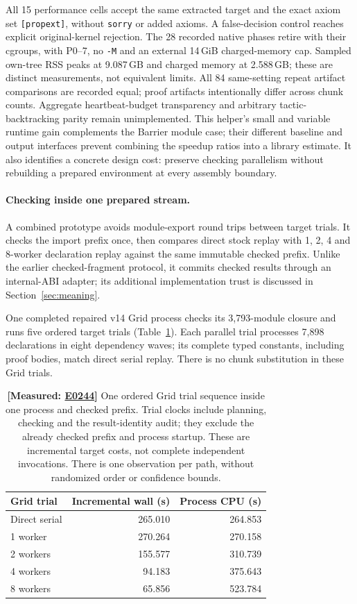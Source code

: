 \documentclass[10pt,twocolumn]{article}
\newcommand{\measured}[1]{\textbf{[Measured: #1]}}
\newcommand{\expref}[2]{\href{https://github.com/yunwei37/proofserve/blob/main/docs/tmp/build-and-evaluate/step-#1/step-report.md}{E#2}}
\begin{document}
All 15 performance cells accept the same extracted target and the exact
axiom set \texttt{[propext]}, without \texttt{sorry} or added axioms.
A false-decision control reaches explicit original-kernel rejection.
The 28 recorded native phases retire with their cgroups, with P0--7,
no \texttt{-M} and an external 14\,GiB charged-memory cap.
Sampled own-tree RSS peaks at 9.087\,GB and charged memory at
2.588\,GB; these are distinct measurements, not equivalent limits.
All 84 same-setting repeat artifact comparisons are recorded equal;
proof artifacts intentionally differ across chunk counts.
Aggregate heartbeat-budget transparency and arbitrary tactic-backtracking
parity remain unimplemented.
This helper's small and variable runtime gain complements the Barrier
module case; their different baseline and output interfaces prevent
combining the speedup ratios into a library estimate.
It also identifies a concrete design cost: preserve checking parallelism
without rebuilding a prepared environment at every assembly boundary.

\paragraph{Checking inside one prepared stream.}
A combined prototype avoids module-export round trips between target trials.
It checks the import prefix once, then compares direct stock replay with
1, 2, 4 and 8-worker declaration replay against the same immutable checked
prefix. Unlike the earlier checked-fragment protocol, it commits checked
results through an internal-ABI adapter; its additional implementation
trust is discussed in Section~\ref{sec:meaning}.

One completed repaired v14 Grid process checks its 3,793-module closure and runs five
ordered target trials (Table~\ref{tab:gridstream}).
Each parallel trial processes 7,898 declarations in eight dependency waves;
its complete typed constants, including proof bodies, match direct serial
replay. There is no chunk substitution in these Grid trials.

\begin{table}[t]
\centering\small
\begin{tabular}{lrr}
\toprule
Grid trial & Incremental wall (s) & Process CPU (s)\\
\midrule
Direct serial &265.010&264.853\\
1 worker &270.264&270.158\\
2 workers &155.577&310.739\\
4 workers &94.183&375.643\\
8 workers &65.856&523.784\\
\bottomrule
\end{tabular}
\caption{\measured{\expref{0244-20261101T101651+0000}{0244}} One ordered Grid trial sequence inside one process and checked
prefix. Trial clocks include planning, checking and the result-identity audit;
they exclude the already checked prefix and process startup.
These are incremental target costs, not complete independent invocations.
There is one observation per path, without randomized order or confidence bounds.}
\label{tab:gridstream}
\end{table}
\end{document}
